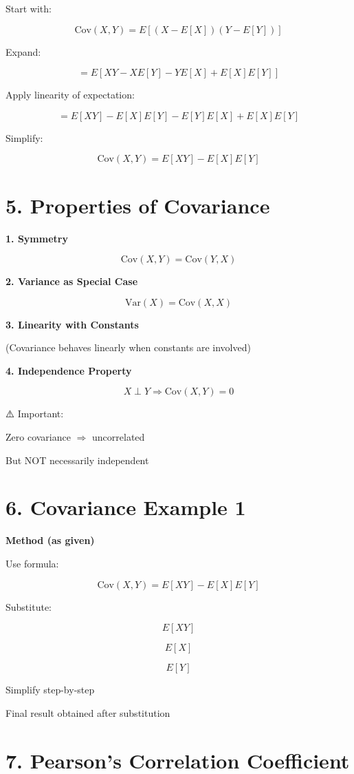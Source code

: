 \documentclass[12pt]{article}
\begin{document}
Start with:

\[
\text{Cov}(X,Y) = E[(X - E[X])(Y - E[Y])]
\]

Expand:

\[
= E[XY - X E[Y] - Y E[X] + E[X]E[Y]]
\]

Apply linearity of expectation:

\[
= E[XY] - E[X]E[Y] - E[Y]E[X] + E[X]E[Y]
\]

Simplify:

\[
\text{Cov}(X,Y) = E[XY] - E[X]E[Y]
\]

\section*{5. Properties of Covariance}

\textbf{1. Symmetry}

\[
\text{Cov}(X,Y) = \text{Cov}(Y,X)
\]

\textbf{2. Variance as Special Case}

\[
\text{Var}(X) = \text{Cov}(X,X)
\]

\textbf{3. Linearity with Constants}

(Covariance behaves linearly when constants are involved)

\textbf{4. Independence Property}

\[
X \perp Y \Rightarrow \text{Cov}(X,Y) = 0
\]

⚠️ Important:

Zero covariance $\Rightarrow$ uncorrelated

But NOT necessarily independent

\section*{6. Covariance Example 1}

\textbf{Method (as given)}

Use formula:

\[
\text{Cov}(X,Y) = E[XY] - E[X]E[Y]
\]

Substitute:

\[
E[XY]
\]

\[
E[X]
\]

\[
E[Y]
\]

Simplify step-by-step

Final result obtained after substitution

\section*{7. Pearson’s Correlation Coefficient}
\end{document}
